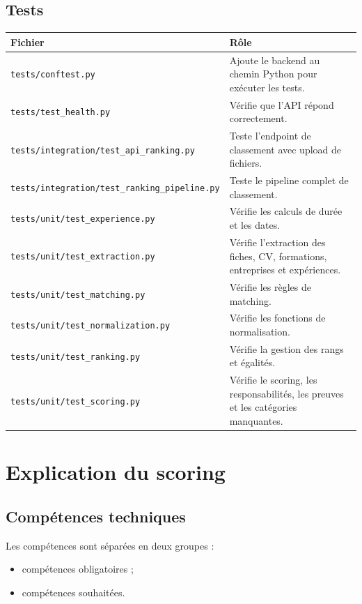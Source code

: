 \documentclass[12pt,a4paper]{report}
\begin{document}
\section{Tests}

\begin{longtable}{|p{5cm}|p{9cm}|}
\hline
\textbf{Fichier} & \textbf{Rôle} \\
\hline
\endhead
\texttt{tests/conftest.py} & Ajoute le backend au chemin Python pour exécuter les tests. \\
\hline
\texttt{tests/test\_health.py} & Vérifie que l'API répond correctement. \\
\hline
\texttt{tests/integration/test\_api\_ranking.py} & Teste l'endpoint de classement avec upload de fichiers. \\
\hline
\texttt{tests/integration/test\_ranking\_pipeline.py} & Teste le pipeline complet de classement. \\
\hline
\texttt{tests/unit/test\_experience.py} & Vérifie les calculs de durée et les dates. \\
\hline
\texttt{tests/unit/test\_extraction.py} & Vérifie l'extraction des fiches, CV, formations, entreprises et expériences. \\
\hline
\texttt{tests/unit/test\_matching.py} & Vérifie les règles de matching. \\
\hline
\texttt{tests/unit/test\_normalization.py} & Vérifie les fonctions de normalisation. \\
\hline
\texttt{tests/unit/test\_ranking.py} & Vérifie la gestion des rangs et égalités. \\
\hline
\texttt{tests/unit/test\_scoring.py} & Vérifie le scoring, les responsabilités, les preuves et les catégories manquantes. \\
\hline
\end{longtable}

\chapter{Explication du scoring}

\section{Compétences techniques}

Les compétences sont séparées en deux groupes :

\begin{itemize}
    \item compétences obligatoires ;
    \item compétences souhaitées.
\end{itemize}
\end{document}
